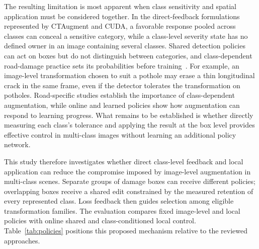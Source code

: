 \documentclass[conference]{IEEEtran}
\begin{document}
The resulting limitation is most apparent when class sensitivity and spatial application must be considered together. In the direct-feedback formulations represented by CTAugment and CUDA, a favorable response pooled across classes can conceal a sensitive category, while a class-level severity state has no defined owner in an image containing several classes. Shared detection policies~\cite{zoph2020det,chen2021scale} can act on boxes but do not distinguish between categories, and class-dependent road-damage practice sets its probabilities before training~\cite{rdd_detectron2}. For example, an image-level transformation chosen to suit a pothole may erase a thin longitudinal crack in the same frame, even if the detector tolerates the transformation on potholes. Road-specific studies establish the importance of class-dependent augmentation, while online and learned policies show how augmentation can respond to learning progress. What remains to be established is whether directly measuring each class's tolerance and applying the result at the box level provides effective control in multi-class images without learning an additional policy network.

This study therefore investigates whether direct class-level feedback and local application can reduce the compromise imposed by image-level augmentation in multi-class scenes. Separate groups of damage boxes can receive different policies; overlapping boxes receive a shared edit constrained by the measured retention of every represented class. Loss feedback then guides selection among eligible transformation families. The evaluation compares fixed image-level and local policies with online shared and class-conditioned local control. Table~\ref{tab:policies} positions this proposed mechanism relative to the reviewed approaches.
\end{document}
